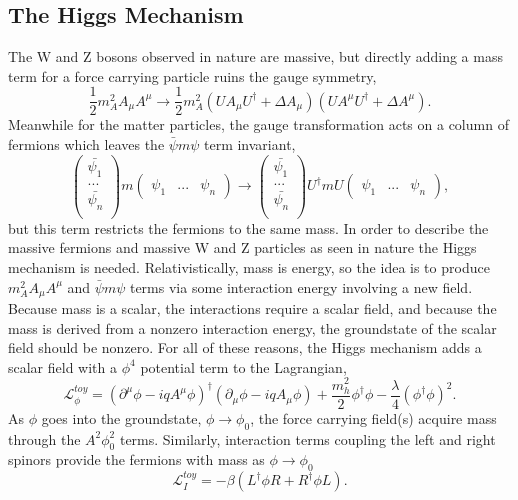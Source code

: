 \subsection{The Higgs Mechanism}
The W and Z bosons observed in nature are massive, but directly adding a mass term for a force carrying particle ruins the gauge symmetry, 
\begin{equation}
\frac{1}{2}m_A^2A_\mu A^\mu \rightarrow \frac{1}{2}m_A^2(UA_\mu U^\dagger + \Delta A_\mu)(UA^\mu U^\dagger + \Delta A^\mu). 
\end{equation}
Meanwhile for the matter particles, the gauge transformation acts on a column of fermions which leaves the $\bar{\psi}m\psi$ term invariant,  
\begin{equation}
\begin{pmatrix}
\bar{\psi_1} \\
...          \\
\bar{\psi_n} \\
\end{pmatrix}
m
\begin{pmatrix}
\psi_1 & ... & \psi_n
\end{pmatrix}
\rightarrow
\begin{pmatrix}
\bar{\psi_1} \\
...          \\
\bar{\psi_n} \\
\end{pmatrix}
U^\dagger mU
\begin{pmatrix}
\psi_1 & ... & \psi_n
\end{pmatrix},
\end{equation}
but this term restricts the fermions to the same mass. In order to describe the massive fermions and massive W and Z particles as seen in nature the Higgs mechanism is needed. Relativistically, mass is energy, so the idea is to produce $m_A^2A_\mu A^\mu$ and $\bar{\psi}m\psi$ terms via some interaction energy involving a new field. Because mass is a scalar, the interactions require a scalar field, and because the mass is derived from a nonzero interaction energy, the groundstate of the scalar field should be nonzero. For all of these reasons, the Higgs mechanism adds a scalar field with a $\phi^4$ potential term to the Lagrangian, 
\begin{equation}
\label{eq:toyew1}
\mathcal{L}^{toy}_\phi = (\partial^\mu\phi - iqA^\mu\phi)^\dagger(\partial_\mu\phi - iqA_\mu\phi) + \frac{m_h^2}{2}\phi^\dagger\phi - \frac{\lambda}{4}(\phi^\dagger\phi)^2.
\end{equation}
As $\phi$ goes into the groundstate, $\phi \rightarrow \phi_0$, the force carrying field(s) acquire mass through the $A^2\phi_0^2$ terms. Similarly, interaction terms coupling the left and right spinors provide the fermions with mass as $\phi \rightarrow \phi_0$
\begin{equation}
\label{eq:toyew2}
\mathcal{L}^{toy}_I = -\beta(L^\dagger\phi R + R^\dagger\phi L).
\end{equation}

